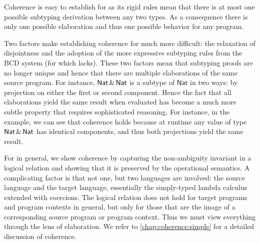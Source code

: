 Coherence is easy to establish for \oname as its rigid rules mean that there is
at most one possible subtyping derivation between any two types.  As a
consequence there is only one possible elaboration and thus one
possible behavior for any program.

Two factors make establishing coherence for \namee much more difficult: the
relaxation of disjointness and the adoption of the more expressive subtyping
rules from the BCD system (for which \oname lacks). These two factors mean that subtyping proofs are no
longer unique and hence that there are multiple elaborations of the same source
program. For instance, $\mathsf{Nat} \,\&\, \mathsf{Nat}$ is a subtype of $\mathsf{Nat}$ in two
ways: by projection on either the first or second component.
Hence the fact that all elaborations yield the same result when evaluated has
become a much more subtle property that requires sophisticated reasoning.
For instance, in the example, we can see that coherence holds because  at
runtime any value of type $\mathsf{Nat} \,\&\, \mathsf{Nat}$ has identical components, and
thus both projections yield the same result.

For \namee in general, we show coherence by capturing the non-ambiguity
invariant in a logical relation and showing that it is preserved by the
operational semantics. A complicating factor is that not one, but two languages
are involved: the source language \namee and the target language, essentially
the simply-typed lambda calculus extended with coercions. The
logical relation does not hold for target programs and program contexts in
general, but only for those that are the image of a corresponding source
program or program context. Thus we must view everything through the lens of
elaboration. We refer to \cref{chap:coherence:simple} for a detailed discussion of coherence.


